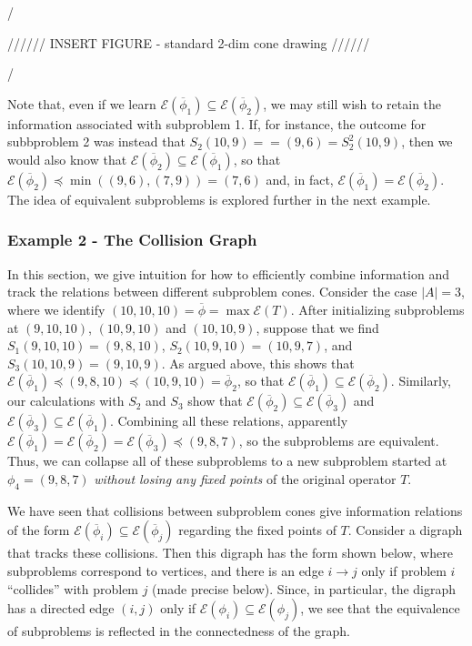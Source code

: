 \documentclass[11pt,reqno]{amsart}
\theoremstyle{definition}
\numberwithin{equation}{section}
\newcommand{\ol}{\overline}
\newcommand{\pre}{\phi}
\newcommand{\sub}{\subseteq}
\newcommand{\fix}{\mathcal{E}}
\newcommand{\peq}{\preceq}
\newcommand{\toppre}{\ol{\pre}}
\begin{document}
/

////// INSERT FIGURE - standard 2-dim cone drawing  //////

/

Note that, even if we learn $\fix(\toppre_1) \sub \fix(\toppre_2)$, we may still wish to retain the information associated with subproblem 1. 
If, for instance, the outcome for subbproblem 2 was instead that $S_2(10,9) =  = (9,6) = S_2^2(10,9)$, then we would also know that $\fix(\toppre_2) \sub \fix(\toppre_1)$, so that $\fix(\toppre_2) \peq \min((9,6),(7,9)) = (7,6)$ and, in fact, $\fix(\toppre_1) = \fix(\toppre_2)$.
The idea of equivalent subproblems is explored further in the next example. 

\subsubsection{Example 2 - The Collision Graph}
In this section, we give intuition for how to efficiently combine information and track the relations between different subproblem cones. 
Consider the case $|A| = 3$, where we identify $(10,10,10) = \toppre = \max \fix(T)$. 
After initializing subproblems at $(9,10,10)$, $(10,9,10)$ and $(10,10,9)$, suppose that we find $S_1(9,10,10) = (9,8,10)$, $S_2(10,9,10) = (10,9,7)$, and $S_3(10,10,9) = (9,10,9)$. 
As argued above, this shows that $\fix(\toppre_1) \peq (9,8,10) \peq (10,9,10) = \toppre_2$, so that $\fix(\toppre_1) \sub \fix(\toppre_2)$. 
Similarly, our calculations with $S_2$ and $S_3$ show that $\fix(\toppre_2) \sub \fix(\toppre_3)$ and $\fix(\toppre_3) \sub \fix(\toppre_1)$. 
Combining all these relations, apparently $\fix(\toppre_1) = \fix(\toppre_2) = \fix(\toppre_3) \peq (9,8,7)$, so the subproblems are equivalent.  
Thus, we can collapse all of these subproblems to a new subproblem started at $\pre_4 = (9,8,7)$ \emph{without losing any fixed points} of the original operator $T$. 

We have seen that collisions between subproblem cones give information relations of the form $\fix(\toppre_i) \sub \fix(\toppre_j)$ regarding the fixed points of $T$.
Consider a digraph that tracks these collisions.
Then this digraph has the form shown below, where subproblems correspond to vertices, and there is an edge $i \to j$ only if problem $i$ ``collides'' with problem $j$ (made precise below). 
Since, in particular, the digraph has a directed edge $(i,j)$ only if $\fix(\pre_i) \sub \fix(\pre_j)$, we see that the equivalence of subproblems is reflected in the connectedness of the graph. 
\end{document}
